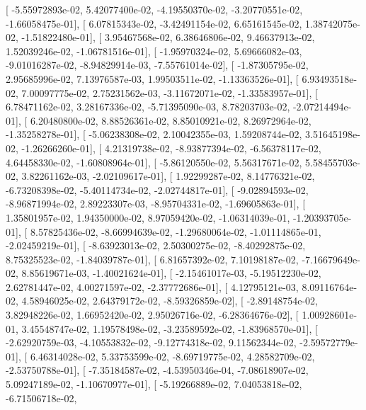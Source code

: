 \documentclass{article}
\begin{document}
       [ -5.55972893e-02,   5.42077400e-02,  -4.19550370e-02,
         -3.20770551e-02,  -1.66058475e-01],
       [  6.07815343e-02,  -3.42491154e-02,   6.65161545e-02,
          1.38742075e-02,  -1.51822480e-01],
       [  3.95467568e-02,   6.38646806e-02,   9.46637913e-02,
          1.52039246e-02,  -1.06781516e-01],
       [ -1.95970324e-02,   5.69666082e-03,  -9.01016287e-02,
         -8.94829914e-03,  -7.55761014e-02],
       [ -1.87305795e-02,   2.95685996e-02,   7.13976587e-03,
          1.99503511e-02,  -1.13363526e-01],
       [  6.93493518e-02,   7.00097775e-02,   2.75231562e-03,
         -3.11672071e-02,  -1.33583957e-01],
       [  6.78471162e-02,   3.28167336e-02,  -5.71395090e-03,
          8.78203703e-02,  -2.07214494e-01],
       [  6.20480800e-02,   8.88526361e-02,   8.85010921e-02,
          8.26972964e-02,  -1.35258278e-01],
       [ -5.06238308e-02,   2.10042355e-03,   1.59208744e-02,
          3.51645198e-02,  -1.26266260e-01],
       [  4.21319738e-02,  -8.93877394e-02,  -6.56378117e-02,
          4.64458330e-02,  -1.60808964e-01],
       [ -5.86120550e-02,   5.56317671e-02,   5.58455703e-02,
          3.82261162e-03,  -2.02109617e-01],
       [  1.92299287e-02,   8.14776321e-02,  -6.73208398e-02,
         -5.40114734e-02,  -2.02744817e-01],
       [ -9.02894593e-02,  -8.96871994e-02,   2.89223307e-03,
         -8.95704331e-02,  -1.69605863e-01],
       [  1.35801957e-02,   1.94350000e-02,   8.97059420e-02,
         -1.06314039e-01,  -1.20393705e-01],
       [  8.57825436e-02,  -8.66994639e-02,  -1.29680064e-02,
         -1.01114865e-01,  -2.02459219e-01],
       [ -8.63923013e-02,   2.50300275e-02,  -8.40292875e-02,
          8.75325523e-02,  -1.84039787e-01],
       [  6.81657392e-02,   7.10198187e-02,  -7.16679649e-02,
          8.85619671e-03,  -1.40021624e-01],
       [ -2.15461017e-03,  -5.19512230e-02,   2.62781447e-02,
          4.00271597e-02,  -2.37772686e-01],
       [  4.12795121e-03,   8.09116764e-02,   4.58946025e-02,
          2.64379172e-02,  -8.59326859e-02],
       [ -2.89148754e-02,   3.82948226e-02,   1.66952420e-02,
          2.95026716e-02,  -6.28364676e-02],
       [  1.00928601e-01,   3.45548747e-02,   1.19578498e-02,
         -3.23589592e-02,  -1.83968570e-01],
       [ -2.62920759e-03,  -4.10553832e-02,  -9.12774318e-02,
          9.11562344e-02,  -2.59572779e-01],
       [  6.46314028e-02,   5.33753599e-02,  -8.69719775e-02,
          4.28582709e-02,  -2.53750788e-01],
       [ -7.35184587e-02,  -4.53950346e-04,  -7.08618907e-02,
          5.09247189e-02,  -1.10670977e-01],
       [ -5.19266889e-02,   7.04053818e-02,  -6.71506718e-02,
\end{document}
